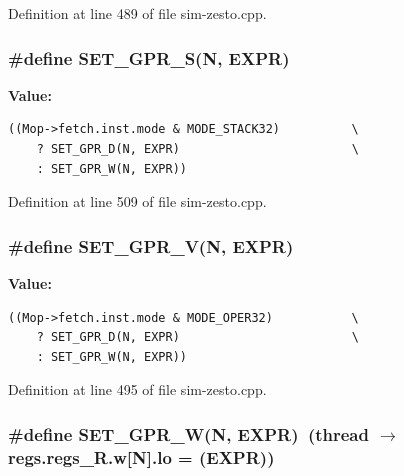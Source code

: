 Definition at line 489 of file sim-zesto.cpp.
\subsubsection[{SET\_\-GPR\_\-S}]{\setlength{\rightskip}{0pt plus 5cm}\#define SET\_\-GPR\_\-S(N, \/  EXPR)}\label{sim-zesto_8cpp_36c3c33eb0e30cbae3b64c6d0803eae4}


\textbf{Value:}

\begin{Code}\begin{verbatim}((Mop->fetch.inst.mode & MODE_STACK32)          \
    ? SET_GPR_D(N, EXPR)                        \
    : SET_GPR_W(N, EXPR))
\end{verbatim}
\end{Code}


Definition at line 509 of file sim-zesto.cpp.
\subsubsection[{SET\_\-GPR\_\-V}]{\setlength{\rightskip}{0pt plus 5cm}\#define SET\_\-GPR\_\-V(N, \/  EXPR)}\label{sim-zesto_8cpp_94ea2069d35ea9a6666a46dd573c310d}


\textbf{Value:}

\begin{Code}\begin{verbatim}((Mop->fetch.inst.mode & MODE_OPER32)           \
    ? SET_GPR_D(N, EXPR)                        \
    : SET_GPR_W(N, EXPR))
\end{verbatim}
\end{Code}


Definition at line 495 of file sim-zesto.cpp.
\subsubsection[{SET\_\-GPR\_\-W}]{\setlength{\rightskip}{0pt plus 5cm}\#define SET\_\-GPR\_\-W(N, \/  EXPR)~(thread $\rightarrow$ regs.regs\_\-R.w[N].lo = (EXPR))}\label{sim-zesto_8cpp_94bc1db9dcc4e27b6f9dc9b181c1f188}





